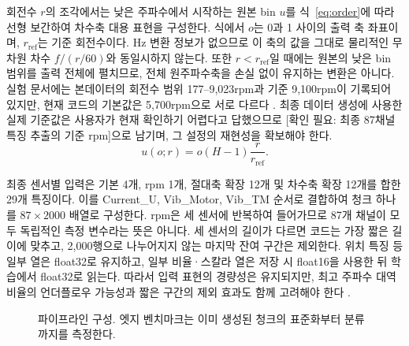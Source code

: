 \documentclass[11pt,a4paper]{article}
\newcommand{\checkneeded}[1]{\textcolor{red!65!black}{[확인 필요: #1]}}
\newcommand{\sourceproject}{\citep{project2026}}
\begin{document}
회전수 $r$의 조각에서는 낮은 주파수에서 시작하는 원본 bin $u$를 식~\eqref{eq:order}에 따라 선형 보간하여 차수축 대용 표현을 구성한다.
식에서 $o$는 0과 1 사이의 출력 축 좌표이며, $r_{\mathrm{ref}}$는 기준 회전수이다.
Hz 변환 정보가 없으므로 이 축의 값을 그대로 물리적인 무차원 차수 $f/(r/60)$와 동일시하지 않는다.
또한 $r<r_{\mathrm{ref}}$일 때에는 원본의 낮은 bin 범위를 출력 전체에 펼치므로, 전체 원주파수축을 손실 없이 유지하는 변환은 아니다.
실험 문서에는 본데이터의 회전수 범위 177--9,023rpm과 기준 9,100rpm이 기록되어 있지만, 현재 코드의 기본값은 5,700rpm으로 서로 다르다 \sourceproject.
최종 데이터 생성에 사용한 실제 기준값은 사용자가 현재 확인하기 어렵다고 답했으므로 \checkneeded{최종 87채널 특징 추출의 기준 rpm}으로 남기며, 그 설정의 재현성을 확보해야 한다.
\begin{equation}
 u(o;r)=o(H-1)\frac{r}{r_{\mathrm{ref}}}.
 \label{eq:order}
\end{equation}

최종 센서별 입력은 기본 4개, rpm 1개, 절대축 확장 12개 및 차수축 확장 12개를 합한 29개 특징이다.
이를 Current\_U, Vib\_Motor, Vib\_TM 순서로 결합하여 청크 하나를 $87\times2000$ 배열로 구성한다.
rpm은 세 센서에 반복하여 들어가므로 87개 채널이 모두 독립적인 측정 변수라는 뜻은 아니다.
세 센서의 길이가 다르면 코드는 가장 짧은 길이에 맞추고, 2,000행으로 나누어지지 않는 마지막 잔여 구간은 제외한다.
위치 특징 등 일부 열은 float32로 유지하고, 일부 비율·스칼라 열은 저장 시 float16을 사용한 뒤 학습에서 float32로 읽는다.
따라서 입력 표현의 경량성은 유지되지만, 최고 주파수 대역 비율의 언더플로우 가능성과 짧은 구간의 제외 효과도 함께 고려해야 한다 \sourceproject.

\begin{figure}[htbp]
\centering
{}
\caption{파이프라인 구성. 엣지 벤치마크는 이미 생성된 청크의 표준화부터 분류까지를 측정한다.}
\label{fig:pipeline}
\end{figure}
\end{document}
